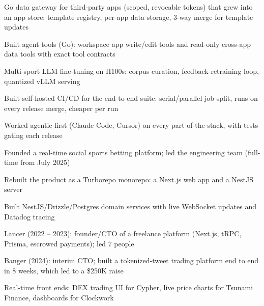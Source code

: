 \documentclass[print]{jack-resume}
\begin{document}
\begin{tightemize}
    \item Go data gateway for third-party apps (scoped, revocable tokens) that grew into an app store: template registry, per-app data storage, 3-way merge for template updates
    \item Built agent tools (Go): workspace app write/edit tools and read-only cross-app data tools with exact tool contracts
    \item Multi-sport LLM fine-tuning on H100s: corpus curation, feedback-retraining loop, quantized vLLM serving
    \item Built self-hosted CI/CD for the end-to-end suite: serial/parallel job split, runs on every release merge, cheaper per run
    \item Worked agentic-first (Claude Code, Cursor) on every part of the stack, with tests gating each release
\end{tightemize}
\sectionsep

\begin{tightemize}
    \item Founded a real-time social sports betting platform; led the engineering team (full-time from July 2025)
    \item Rebuilt the product as a Turborepo monorepo: a Next.js web app and a NestJS server
    \item Built NestJS/Drizzle/Postgres domain services with live WebSocket updates and Datadog tracing
\end{tightemize}
\sectionsep

\begin{tightemize}
    \item Lancer (2022 -- 2023): founder/CTO of a freelance platform (Next.js, tRPC, Prisma, escrowed payments); led 7 people
    \item Banger (2024): interim CTO; built a tokenized-tweet trading platform end to end in 8 weeks, which led to a \$250K raise
    \item Real-time front ends: DEX trading UI for Cypher, live price charts for Tsunami Finance, dashboards for Clockwork
\end{tightemize}
\sectionsep
\end{document}

